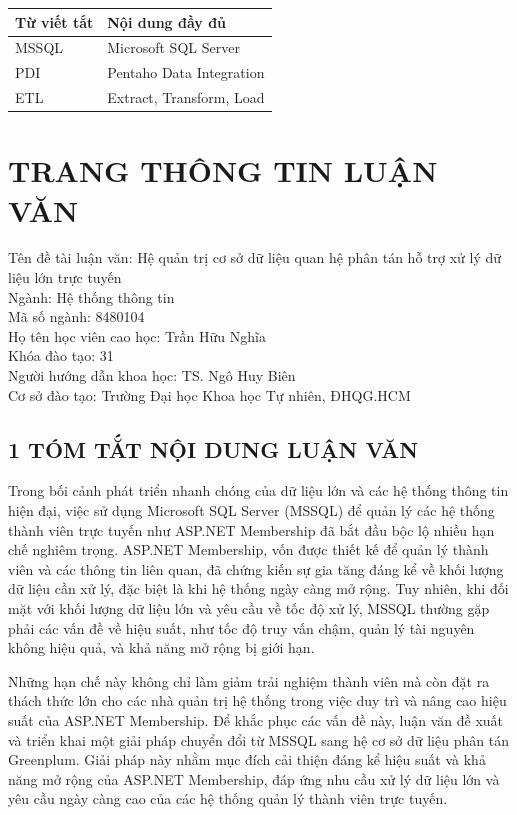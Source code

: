 \documentclass[50pt]{extarticle}
\begin{document}
\begin{center}
\begin{tabular}{|p{3cm}|p{7cm}|}
\hline
\textbf{Từ viết tắt} & \textbf{Nội dung đầy đủ} \\
\hline
MSSQL & Microsoft SQL Server \\
\hline
PDI & Pentaho Data Integration \\
\hline
ETL & Extract, Transform, Load \\
\hline
\end{tabular}
\end{center}


\pagebreak
{}
{}
\section*{\centering \MakeUppercase{TRANG THÔNG TIN LUẬN VĂN}}


Tên đề tài luận văn: Hệ quản trị cơ sở dữ liệu quan hệ phân tán hỗ trợ xử lý dữ liệu lớn trực tuyến\\
Ngành: Hệ thống thông tin\\
Mã số ngành: 8480104\\
Họ tên học viên cao học: Trần Hữu Nghĩa\\
Khóa đào tạo: 31\\
Người hướng dẫn khoa học: TS. Ngô Huy Biên\\
Cơ sở đào tạo: Trường Đại học Khoa học Tự nhiên, ĐHQG.HCM


\subsection*{1 TÓM TẮT NỘI DUNG LUẬN VĂN}
Trong bối cảnh phát triển nhanh chóng của dữ liệu lớn và các hệ thống thông tin hiện đại, việc sử dụng Microsoft SQL Server (MSSQL) để quản lý các hệ thống thành viên trực tuyến như ASP.NET Membership đã bắt đầu bộc lộ nhiều hạn chế nghiêm trọng. ASP.NET Membership, vốn được thiết kế để quản lý thành viên và các thông tin liên quan, đã chứng kiến sự gia tăng đáng kể về khối lượng dữ liệu cần xử lý, đặc biệt là khi hệ thống ngày càng mở rộng. Tuy nhiên, khi đối mặt với khối lượng dữ liệu lớn và yêu cầu về tốc độ xử lý, MSSQL thường gặp phải các vấn đề về hiệu suất, như tốc độ truy vấn chậm, quản lý tài nguyên không hiệu quả, và khả năng mở rộng bị giới hạn.

Những hạn chế này không chỉ làm giảm trải nghiệm thành viên mà còn đặt ra thách thức lớn cho các nhà quản trị hệ thống trong việc duy trì và nâng cao hiệu suất của ASP.NET Membership. Để khắc phục các vấn đề này, luận văn đề xuất và triển khai một giải pháp chuyển đổi từ MSSQL sang hệ cơ sở dữ liệu phân tán Greenplum. Giải pháp này nhằm mục đích cải thiện đáng kể hiệu suất và khả năng mở rộng của ASP.NET Membership, đáp ứng nhu cầu xử lý dữ liệu lớn và yêu cầu ngày càng cao của các hệ thống quản lý thành viên trực tuyến.
\end{document}
